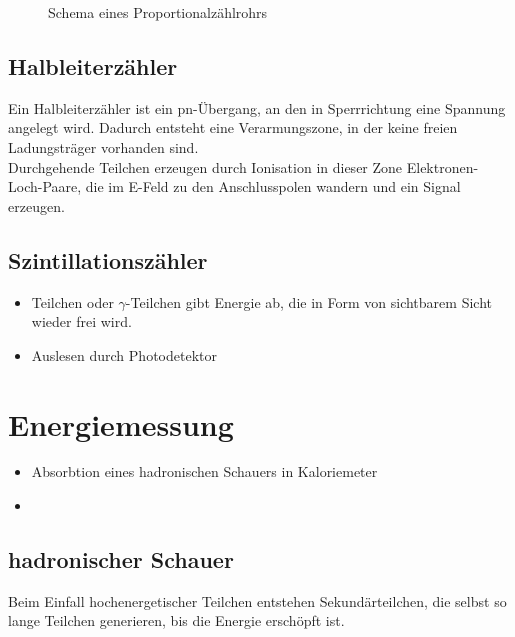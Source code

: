 \documentclass[Ex4_Zusammenfassung.tex]{subfiles}
\begin{document}
\begin{figure}[H]
	\centering
	\caption{Schema eines Proportionalzählrohrs}\label{Proportionalzaehlrohr}
	
\end{figure}

\subsection*{Halbleiterzähler}
Ein Halbleiterzähler ist ein pn-Übergang, an den in Sperrrichtung eine Spannung angelegt wird. Dadurch entsteht eine Verarmungszone, in der keine freien Ladungsträger vorhanden sind.\\
Durchgehende Teilchen erzeugen durch Ionisation in dieser Zone Elektronen-Loch-Paare, die im E-Feld zu den Anschlusspolen wandern und ein Signal erzeugen. 

\subsection*{Szintillationszähler}
\begin{itemize}
	\item Teilchen oder $\gamma$-Teilchen gibt Energie ab, die in Form von sichtbarem Sicht wieder frei wird.
	\item Auslesen durch Photodetektor
\end{itemize}

\section{Energiemessung}

\begin{itemize}
	\item Absorbtion eines hadronischen Schauers in Kaloriemeter
	\item {}
\end{itemize}

\subsection*{hadronischer Schauer}
Beim Einfall hochenergetischer Teilchen entstehen Sekundärteilchen, die selbst so lange Teilchen generieren, bis die Energie erschöpft ist. \\
\end{document}
